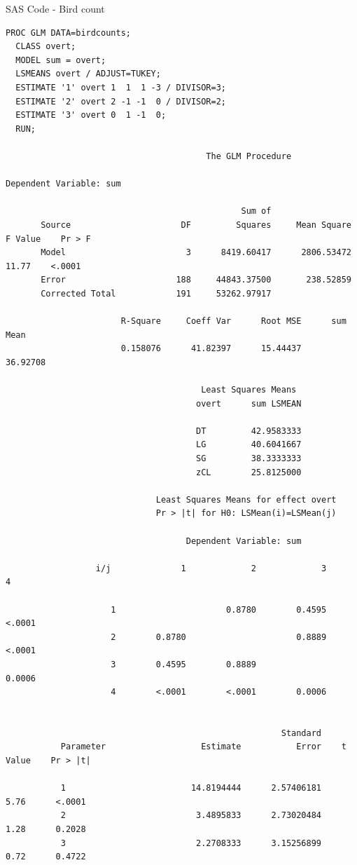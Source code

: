 \documentclass[10pt,draft]{article}
\begin{document}
\newpage
SAS Code - Bird count
\begin{verbatim}
PROC GLM DATA=birdcounts;
  CLASS overt;
  MODEL sum = overt;
  LSMEANS overt / ADJUST=TUKEY;
  ESTIMATE '1' overt 1  1  1 -3 / DIVISOR=3; 
  ESTIMATE '2' overt 2 -1 -1  0 / DIVISOR=2; 
  ESTIMATE '3' overt 0  1 -1  0;
  RUN;

                                        The GLM Procedure

Dependent Variable: sum

                                               Sum of
       Source                      DF         Squares     Mean Square    F Value    Pr > F
       Model                        3      8419.60417      2806.53472      11.77    <.0001
       Error                      188     44843.37500       238.52859
       Corrected Total            191     53262.97917

                       R-Square     Coeff Var      Root MSE      sum Mean
                       0.158076      41.82397      15.44437      36.92708
                                        
                                       Least Squares Means
                                      overt      sum LSMEAN

                                      DT         42.9583333
                                      LG         40.6041667
                                      SG         38.3333333
                                      zCL        25.8125000
                                                                     
                              Least Squares Means for effect overt
                              Pr > |t| for H0: LSMean(i)=LSMean(j)

                                    Dependent Variable: sum

                  i/j              1             2             3             4

                     1                      0.8780        0.4595        <.0001
                     2        0.8780                      0.8889        <.0001
                     3        0.4595        0.8889                      0.0006
                     4        <.0001        <.0001        0.0006


                                                       Standard
           Parameter                   Estimate           Error    t Value    Pr > |t|

           1                         14.8194444      2.57406181       5.76      <.0001
           2                          3.4895833      2.73020484       1.28      0.2028
           3                          2.2708333      3.15256899       0.72      0.4722
\end{verbatim}
\end{document}
